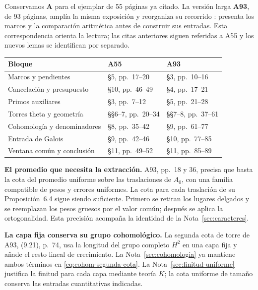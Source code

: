 Conservamos \textbf{A} para el ejemplar de 55 páginas ya citado.
La versión larga \textbf{A93}, de 93 páginas, amplía la misma
exposición y reorganiza su recorrido \cite{fuenteA93}: presenta
los marcos y la comparación aritmética antes de construir sus entradas.
Esta correspondencia orienta la lectura; las citas anteriores siguen
referidas a A55 y los nuevos lemas se identifican por separado.

\begin{center}
\small
\begin{tabularx}{\textwidth}{@{}>{\raggedright\arraybackslash}p{}YY@{}}
\toprule
\textbf{Bloque} & \textbf{A55} & \textbf{A93} \\
\midrule
Marcos y pendientes & §5, pp.~17--20 & §3, pp.~10--16 \\
Cancelación y presupuesto & §10, pp.~46--49 & §4, pp.~17--21 \\
Primos auxiliares & §3, pp.~7--12 & §5, pp.~21--28 \\
Torres theta y geometría & §§6--7, pp.~20--34 & §§7--8, pp.~37--61 \\
Cohomología y denominadores & §8, pp.~35--42 & §9, pp.~61--77 \\
Entrada de Galois & §9, pp.~42--46 & §10, pp.~77--85 \\
Ventana común y conclusión & §11, pp.~49--52 & §11, pp.~85--89 \\
\bottomrule
\end{tabularx}
\end{center}

\textbf{El promedio que necesita la extracción.}
A93, pp.~18 y 36, precisa que basta la cota del promedio uniforme
sobre las traslaciones de $A_0$, con una familia compatible de pesos
y errores uniformes. La cota para cada traslación de su
Proposición~6.4 sigue siendo suficiente. Primero se retiran los
lugares delgados y se reemplazan los pesos gruesos por el valor
común; después se aplica la ortogonalidad. Esta precisión acompaña
la identidad de la Nota~\ref{sec:caracteres}.

\textbf{La capa fija conserva su grupo cohomológico.}
La segunda cota de torre de A93, (9.21), p.~74, usa la longitud
del grupo completo $H^2$ en una capa fija y añade el resto lineal
de crecimiento. La Nota~\ref{sec:cohomologia} ya mantiene ambos
términos en \eqref{eq:cohom-segunda-cota}.
La Nota~\ref{sec:finitud-uniforme} justifica la finitud para cada
capa mediante teoría $K$; la cota uniforme de tamaño conserva
las entradas cuantitativas indicadas.

